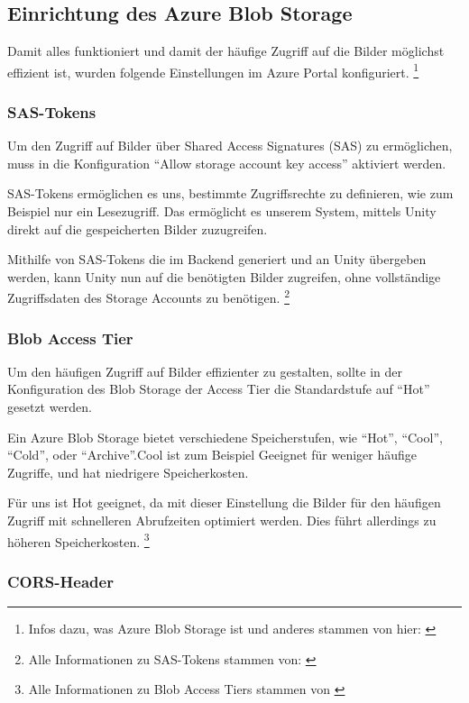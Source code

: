 \subsection{Einrichtung des Azure Blob Storage}

Damit alles funktioniert und damit der häufige Zugriff auf die Bilder
möglichst effizient ist, wurden folgende Einstellungen im Azure Portal
konfiguriert. \footnote{Infos dazu, was Azure Blob Storage ist und anderes stammen von hier: \cite{MicrosoftCorporationd}}

\subsubsection{SAS-Tokens}

Um den Zugriff auf Bilder über Shared Access Signatures (SAS) zu ermöglichen, muss in 
die Konfiguration ``Allow storage account key access'' aktiviert werden.

SAS-Tokens ermöglichen es uns, bestimmte Zugriffsrechte zu definieren, wie zum Beispiel
nur ein Lesezugriff. Das ermöglicht es unserem System, mittels Unity direkt auf die
gespeicherten Bilder zuzugreifen.

Mithilfe von SAS-Tokens die im Backend generiert und an Unity übergeben werden, 
kann Unity nun auf die benötigten Bilder zugreifen, ohne vollständige Zugriffsdaten 
des Storage Accounts zu benötigen. \footnote{Alle Informationen zu SAS-Tokens stammen von: \cite{MicrosoftCorporationa}}


\subsubsection{Blob Access Tier}

Um den häufigen Zugriff auf Bilder effizienter zu gestalten, sollte in der Konfiguration 
des Blob Storage der Access Tier die Standardstufe auf ``Hot'' gesetzt werden.

Ein Azure Blob Storage bietet verschiedene Speicherstufen, wie ``Hot'', ``Cool'', ``Cold'',
oder ``Archive''.Cool ist zum Beispiel Geeignet für weniger häufige Zugriffe, und hat
niedrigere Speicherkosten. 

Für uns ist Hot geeignet, da mit dieser Einstellung die Bilder
für den häufigen Zugriff mit schnelleren Abrufzeiten optimiert werden. Dies führt allerdings
zu höheren Speicherkosten. \footnote{Alle Informationen zu Blob Access Tiers stammen von \cite{MicrosoftCorporationb}}


\subsubsection{CORS-Header}

